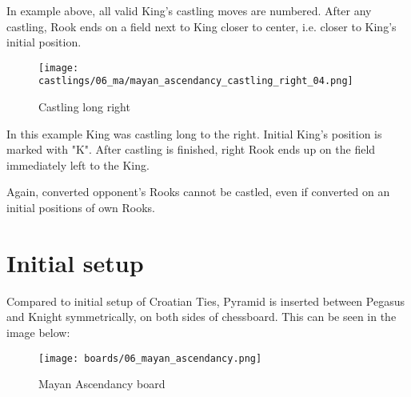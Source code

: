 In example above, all valid King's castling moves are numbered. After any castling, Rook
ends on a field next to King closer to center, i.e. closer to King's initial position.

\noindent
\begin{figure}[!h]
\texttt{[image: castlings/06\_ma/mayan\_ascendancy\_castling\_right\_04.png]}
\caption{Castling long right}
\label{fig:mayan_ascendancy_castling_right_04}
\end{figure}

In this example King was castling long to the right. Initial King's position is marked with "K".
After castling is finished, right Rook ends up on the field immediately left to the King.

Again, converted opponent's Rooks cannot be castled, even if converted on an initial
positions of own Rooks.

\clearpage %

\section*{Initial setup}
\label{sec:Mayan Ascendancy/Initial setup}

Compared to initial setup of Croatian Ties, Pyramid is inserted between Pegasus and Knight
symmetrically, on both sides of chessboard. This can be seen in the image below:

\noindent
\begin{figure}[h]
\texttt{[image: boards/06\_mayan\_ascendancy.png]}
\caption{Mayan Ascendancy board}
\label{fig:06_mayan_ascendancy}
\end{figure}

\clearpage %
